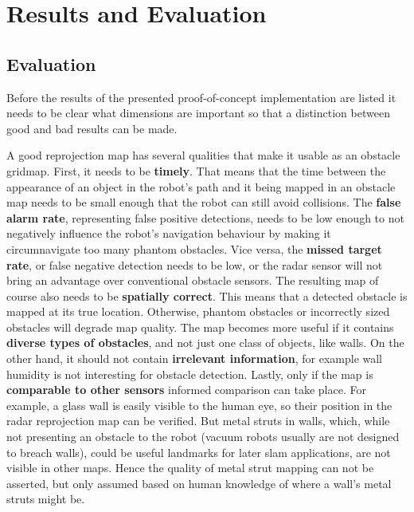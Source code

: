 \chapter{Results and Evaluation}\label{results-and-evaluation}

\section{Evaluation}\label{evaluation}

Before the results of the presented proof-of-concept implementation are listed it needs to be clear what dimensions are important so that a distinction between good and bad results can be made.

A good reprojection map has several qualities that make it usable as an obstacle gridmap. First, it needs to be \textbf{timely}. That means that the time between the appearance of an object in the robot's path and it being mapped in an obstacle map needs to be small enough that the robot can still avoid collisions. The \textbf{false alarm rate}, representing false positive detections, needs to be low enough to not negatively influence the robot's navigation behaviour by making it circumnavigate too many phantom obstacles. Vice versa, the \textbf{missed target rate}, or false negative detection needs to be low, or the radar sensor will not bring an advantage over conventional obstacle sensors. The resulting map of course also needs to be \textbf{spatially correct}. This means that a detected obstacle is mapped at its true location. Otherwise, phantom obstacles or incorrectly sized obstacles will degrade map quality. The map becomes more useful if it contains \textbf{diverse types of obstacles}, and not just one class of objects, like walls. On the other hand, it should not contain \textbf{irrelevant information}, for example wall humidity is not interesting for obstacle detection. Lastly, only if the map is \textbf{comparable to other sensors} informed comparison can take place. For example, a glass wall is easily visible to the human eye, so their position in the radar reprojection map can be verified. But metal struts in walls, which, while not presenting an obstacle to the robot (vacuum robots usually are not designed to breach walls), could be useful landmarks for later slam applications, are not visible in other maps. Hence the quality of metal strut mapping can not be asserted, but only assumed based on human knowledge of where a wall's metal struts might be.

